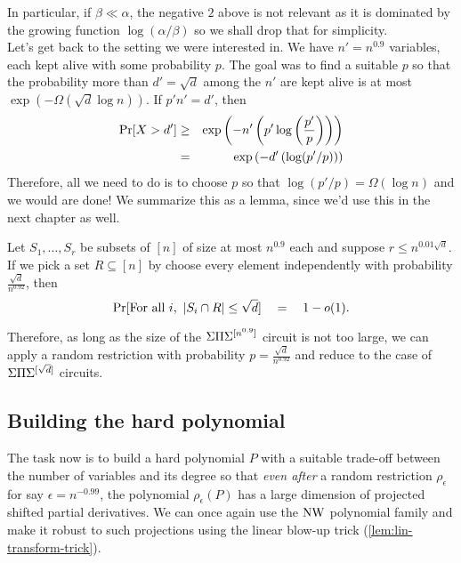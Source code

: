 \noindent In particular, if $\beta \ll \alpha$, the negative $2$ above is not relevant as it is dominated by the growing function $\log(\alpha/\beta)$ so we shall drop that for simplicity.\\

Let's get back to the setting we were interested in.
We have $n' = n^{0.9}$ variables, each kept alive with some probability $p$.
The goal was to find a suitable $p$ so that the probability more than $d' = \sqrt{d}$ among the $n'$ are kept alive is at most $\exp(-\Omega(\sqrt{d} \log n))$. If $p'n' =  d'$, then
\begin{eqnarray*}
\Pr[X > d'] & \geq & \exp\left(-n' \left(p'\log\left(\frac{p'}{p}\right)\right)\right)\\
 & = & \exp\left(-d'\left(\log(p'/p)\right)\right)
\end{eqnarray*}
Therefore, all we need to do is to choose $p$ so that $\log(p'/p) = \Omega(\log n)$ and we would are done!
We summarize this as a lemma, since we'd use this in the next chapter as well.

\begin{lemma}\label{lem:single-step-fanin-reduction}
Let $S_1,\ldots, S_r$ be subsets of $[n]$ of size at most $n^{0.9}$ each and suppose $r \leq n^{0.01 \sqrt{d}}$. If we pick a set $R \subseteq [n]$ by choose every element independently with probability $\frac{\sqrt{d}}{n^{0.92}}$, then
\[
\Pr[\text{For all $i$, } \left|S_i \cap R\right| \leq \sqrt{d}] \quad = \quad 1 - o(1).
\]
\end{lemma}

Therefore, as long as the size of the $\Sigma\Pi\Sigma^{[n^{0.9}]}$ circuit is not too large, we can apply a random restriction with probability $p = \frac{\sqrt{d}}{n^{0.92}}$ and reduce to the case of $\Sigma\Pi\Sigma^{[\sqrt{d}]}$ circuits. 

\subsection{Building the hard polynomial}

The task now is to build a hard polynomial $P$ with a suitable trade-off between the number of variables and its degree so that  \emph{even after} a random restriction $\rho_\epsilon$ for say $\epsilon = n^{-0.99}$, the polynomial $\rho_\epsilon(P)$ has a large dimension of projected shifted partial derivatives. We can once again use the $\operatorname{\mathrm{NW}}$ polynomial family and make it robust to such projections using the linear blow-up trick (\autoref{lem:lin-transform-trick}). 

